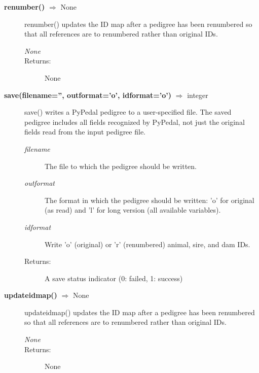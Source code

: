 \begin{description}
\item[\textbf{renumber()} $\Rightarrow$ None]
renumber() updates the ID map after a pedigree has been renumbered so that all references are to renumbered rather than original IDs.
\begin{description}
\item[\emph{None}]
\item[Returns:] None
\end{description}

\item[\textbf{save(filename='', outformat='o', idformat='o')} $\Rightarrow$ integer]
save() writes a PyPedal pedigree to a user-specified file. The saved pedigree includes all fields recognized by PyPedal, not just the original fields read from the input pedigree file.
\begin{description}
\item[\emph{filename}] The file to which the pedigree should be written.
\item[\emph{outformat}] The format in which the pedigree should be written: 'o' for original (as read) and 'l' for long version (all available variables).
\item[\emph{idformat}] Write 'o' (original) or 'r' (renumbered) animal, sire, and dam IDs.
\item[Returns:] A save status indicator (0: failed, 1: success)
\end{description}

\item[\textbf{updateidmap()} $\Rightarrow$ None]
updateidmap() updates the ID map after a pedigree has been renumbered so that all references are to renumbered rather than original IDs.
\begin{description}
\item[\emph{None}]
\item[Returns:] None
\end{description}

\end{description}

